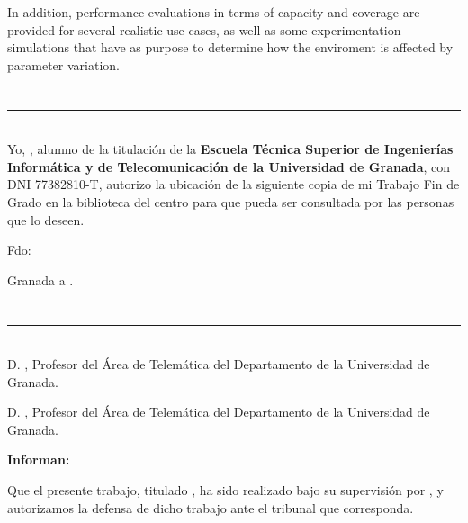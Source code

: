 In addition, performance evaluations in terms of capacity and coverage are provided for several realistic use cases, as well as some experimentation simulations that have as purpose to determine how the enviroment is affected by parameter variation.

\chapter*{}
\thispagestyle{empty}

\noindent\rule[-1ex]{\textwidth}{2pt}\\[4.5ex]

Yo, \textbf{\myName}, alumno de la titulación \myDegree de la \textbf{Escuela Técnica Superior
de Ingenierías Informática y de Telecomunicación de la Universidad de Granada}, con DNI 77382810-T, autorizo la
ubicación de la siguiente copia de mi Trabajo Fin de Grado en la biblioteca del centro para que pueda ser
consultada por las personas que lo deseen.

\vspace{6cm}

\noindent Fdo: \myName

\vspace{2cm}

\begin{flushright}
Granada a \myTime.
\end{flushright}


\chapter*{}
\thispagestyle{empty}

\noindent\rule[-1ex]{\textwidth}{2pt}\\[4.5ex]

D. \textbf{\myProf}, Profesor del Área de Telemática del Departamento \myDepartment de la Universidad de Granada.

\vspace{0.5cm}

D. \textbf{\myOtherProf}, Profesor del Área de Telemática del Departamento \myDepartment de la Universidad de Granada.


\vspace{0.5cm}

\textbf{Informan:}

\vspace{0.5cm}

Que el presente trabajo, titulado \textit{\textbf{\myTitle}},
ha sido realizado bajo su supervisión por \textbf{\myName}, y autorizamos la defensa de dicho trabajo ante el tribunal
que corresponda.

